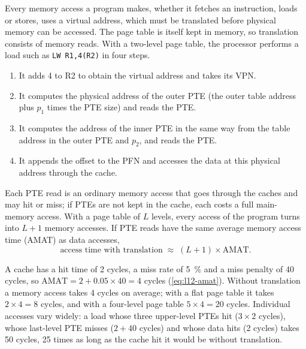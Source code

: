 \documentclass[../main.tex]{subfiles}
\begin{document}
Every memory access a program makes, whether it fetches an instruction, loads
or stores, uses a virtual address, which must be translated before physical
memory can be accessed.  The page
table is itself kept in memory, so translation consists of memory reads.  With
a two-level page table, the processor performs a load such as
\texttt{LW R1,4(R2)} in four steps.
\begin{enumerate}
  \item It adds 4 to R2 to obtain the virtual address and takes its VPN.
  \item It computes the physical address of the outer PTE (the outer table
    address plus $p_1$ times the PTE size) and reads the PTE.
  \item It computes the address of the inner PTE in the same way from the
    table address in the outer PTE and $p_2$, and reads the PTE.
  \item It appends the offset to the PFN and accesses the data at this
    physical address through the cache.
\end{enumerate}
Each PTE read is an ordinary memory access that goes through the caches and may
hit or miss; if PTEs are not kept in the cache, each costs a full main-memory
access.  With a page table of $L$ levels, every access of the program turns
into $L + 1$ memory accesses.  If PTE reads have the same average memory
access time (AMAT) as data accesses,
\begin{equation}
  \text{access time with translation} \;\approx\; (L + 1) \times \text{AMAT} .
  \label{eq:l13-walk-time}
\end{equation}

\begin{example}
  \label{ex:l13-access-time}
  A cache has a hit time of 2 cycles, a miss rate of \SI{5}{\percent} and a
  miss penalty of 40 cycles, so $\text{AMAT} = 2 + 0.05 \times 40 = 4$ cycles
  (\cref{eq:l12-amat}).  Without translation a memory access takes 4 cycles on
  average; with a flat page table it takes $2 \times 4 = 8$ cycles, and with a
  four-level page table $5 \times 4 = 20$ cycles.  Individual accesses vary
  widely: a load whose three upper-level PTEs hit ($3 \times 2$ cycles), whose
  last-level PTE misses ($2 + 40$ cycles) and whose data hits (2 cycles) takes
  50 cycles, 25 times as long as the cache hit it would be without
  translation.
\end{example}
\end{document}

